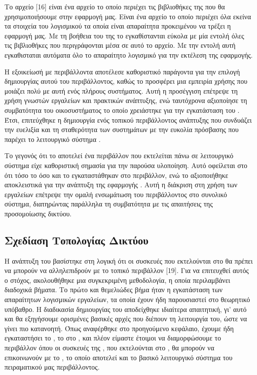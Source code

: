 Το αρχείο [16] είναι ένα αρχείο το οποίο περιέχει τις βιβλιοθήκες της  που θα χρησιμοποιήσουμε στην εφαρμογή μας. Είναι ένα  αρχείο το οποίο περιέχει όλα εκείνα τα στοιχεία του λογισμικού τα οποία είναι απαραίτητα προκειμένου να τρέξει η εφαρμογή μας. Με τη βοήθεια του  της  το  εγκαθίστανται εύκολα με μία εντολή όλες τις βιβλιοθήκες που περιγράφονται μέσα σε αυτό το  αρχείο. Με την εντολή αυτή  εγκαθισταται αυτόματα όλο το απαραίτητο λογισμικό για την εκτέλεση της εφαρμογής.

Η εξοικείωσή με περιβάλλοντα  αποτέλεσε καθοριστικό παράγοντα
για την επιλογή δημιουργίας αυτού του περιβάλλοντος, καθώς το  προσφέρει μια 
εμπειρία χρήσης που μοιάζει πολύ με αυτή ενός πλήρους  
συστήματος. Αυτή η προσέγγιση επέτρεψε τη χρήση γνωστών εργαλείων και 
πρακτικών ανάπτυξης, ενώ ταυτόχρονα αξιοποίησε τη συμβατότητα του  
οικοσυστήματος το οποίο χρειάστηκε για την εγκατάσταση του . Έτσι, επιτεύχθηκε η δημιουργία ενός τοπικού περιβάλλοντος 
ανάπτυξης που συνδυάζει την ευελιξία και τη σταθερότητα των  
συστημάτων με την ευκολία πρόσβασης που παρέχει το λειτουργικό σύστημα .

Το γεγονός ότι το  αποτελεί ένα  περιβάλλον που εκτελείται πάνω σε λειτουργικό σύστημα  είχε καθοριστική σημασία για την παρούσα υλοποίηση. Αυτό οφείλεται στο ότι τόσο το  όσο και το  εγκαταστάθηκαν στο  περιβάλλον, ενώ το  αξιοποιήθηκε αποκλειστικά για την ανάπτυξη της εφαρμογής . Αυτή η διάκριση στη χρήση των εργαλείων επέτρεψε την ομαλή ενσωμάτωση του  περιβάλλοντος στο συνολικό σύστημα, διατηρώντας παράλληλα τη συμβατότητα με τις απαιτήσεις της προσομοίωσης δικτύου.

\subsection{Σχεδίαση Τοπολογίας Δικτύου}

Η ανάπτυξη του  βασίστηκε στη λογική ότι οι συσκευές που εκτελούνται στο  θα πρέπει να μπορούν να αλληλεπιδρούν με το τοπικό περιβάλλον [19]. Για να επιτευχθεί αυτός ο στόχος, ακολουθήθηκε μια συγκεκριμένη μεθοδολογία, η οποία περιλαμβάνει διαδοχικά βήματα.
Το πρώτο και θεμελιώδες βήμα ήταν η εγκατάσταση των απαραίτητων λογισμικών εργαλείων, τα οποία έχουν ήδη παρουσιαστεί στο θεωρητικό υπόβαθρο. Η διαδικασία δημιουργίας του  αποδείχθηκε ιδιαίτερα απαιτητική, γι' αυτό και θα εξηγήσουμε ορισμένες βασικές αρχές που διέπουν τη λειτουργία του, ώστε να γίνει πιο κατανοητή.
Όπως αναφέρθηκε στο προηγούμενο κεφάλαιο, έχουμε ήδη εγκαταστήσει το , το  στο , και πλέον είμαστε έτοιμοι να διαμορφώσουμε το περιβάλλον όπου οι συσκευές της , που εκτελούνται στο , θα μπορούν να επικοινωνούν με το , το οποίο αποτελεί και το βασικό λειτουργικό σύστημα του πειραματικού μας περιβάλλοντος.


